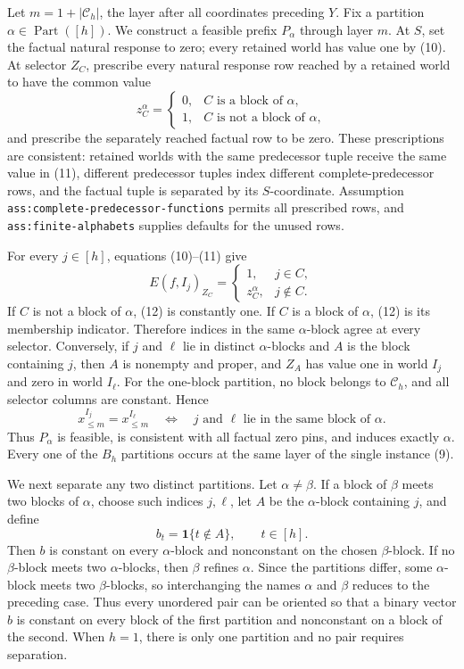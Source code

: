 Let \(m=1+|\mathscr C_h|\), the layer after all coordinates preceding \(Y\).  Fix a partition \(\alpha\in\operatorname{Part}([h])\).  We construct a feasible prefix \(P_\alpha\) through layer \(m\).  At \(S\), set the factual natural response to zero; every retained world has value one by (10).  At selector \(Z_C\), prescribe every natural response row reached by a retained world to have the common value
\[
 z_C^\alpha=
 \begin{cases}
 0,&C\text{ is a block of }\alpha,\\
 1,&C\text{ is not a block of }\alpha,
 \end{cases}
\tag{11}
\]
and prescribe the separately reached factual row to be zero.  These prescriptions are consistent: retained worlds with the same predecessor tuple receive the same value in (11), different predecessor tuples index different complete-predecessor rows, and the factual tuple is separated by its \(S\)-coordinate.  Assumption \texttt{ass:complete-predecessor-functions} permits all prescribed rows, and \texttt{ass:finite-alphabets} supplies defaults for the unused rows.

For every \(j\in[h]\), equations (10)--(11) give
\[
 E(f,I_j)_{Z_C}=
 \begin{cases}
 1,&j\in C,\\
 z_C^\alpha,&j\notin C.
 \end{cases}
\tag{12}
\]
If \(C\) is not a block of \(\alpha\), (12) is constantly one.  If \(C\) is a block of \(\alpha\), (12) is its membership indicator.  Therefore indices in the same \(\alpha\)-block agree at every selector.  Conversely, if \(j\) and \(\ell\) lie in distinct \(\alpha\)-blocks and \(A\) is the block containing \(j\), then \(A\) is nonempty and proper, and \(Z_A\) has value one in world \(I_j\) and zero in world \(I_\ell\).  For the one-block partition, no block belongs to \(\mathscr C_h\), and all selector columns are constant.  Hence
\[
 x^{I_j}_{\leq m}=x^{I_\ell}_{\leq m}
 \quad\Longleftrightarrow\quad
 j\text{ and }\ell\text{ lie in the same block of }\alpha.
\tag{13}
\]
Thus \(P_\alpha\) is feasible, is consistent with all factual zero pins, and induces exactly \(\alpha\).  Every one of the \(B_h\) partitions occurs at the same layer of the single instance (9).

We next separate any two distinct partitions.  Let \(\alpha\neq\beta\).  If a block of \(\beta\) meets two blocks of \(\alpha\), choose such indices \(j,\ell\), let \(A\) be the \(\alpha\)-block containing \(j\), and define
\[
 b_t=\mathbf1\{t\notin A\},\qquad t\in[h].
\tag{14}
\]
Then \(b\) is constant on every \(\alpha\)-block and nonconstant on the chosen \(\beta\)-block.  If no \(\beta\)-block meets two \(\alpha\)-blocks, then \(\beta\) refines \(\alpha\).  Since the partitions differ, some \(\alpha\)-block meets two \(\beta\)-blocks, so interchanging the names \(\alpha\) and \(\beta\) reduces to the preceding case.  Thus every unordered pair can be oriented so that a binary vector \(b\) is constant on every block of the first partition and nonconstant on a block of the second.  When \(h=1\), there is only one partition and no pair requires separation.

